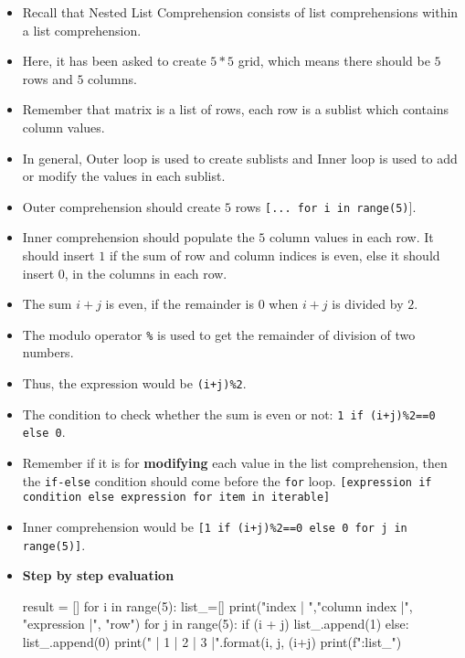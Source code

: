 \documentclass[10pt]{extarticle}
\begin{document}
\begin{itemize}
    \item Recall that Nested List Comprehension consists of list comprehensions within a list comprehension.
    \item Here, it has been asked to create $ 5*5$ grid, which means there should be $5$ rows and $5$ columns. 
    \item Remember that matrix is a list of rows, each row is a sublist which contains column values.
    \item In general, Outer loop is used to create sublists and Inner loop is used to add or modify the values in each sublist. 
    \item Outer comprehension should create $5$ rows  \colorbox{gray!20}{\texttt{[... for i in range(5)}]}.
    \item Inner comprehension should populate the $5$ column values in each row. It should insert $1$ if the sum of row and column indices is even, else it 
    should insert $0$, in the columns in each row.
    \item The sum $i + j$ is even, if the remainder is $0$ when $i + j$  is divided by $2$.
    \item The modulo operator \colorbox{gray!20}{\texttt{\%}} is used to get the remainder of division of two numbers. 
    \item Thus, the expression would be \colorbox{gray!20}{\texttt{(i+j)\%2}}.
    \item The condition to check whether the sum is even or not: \colorbox{gray!20}{\texttt{1 if (i+j)\%2==0 else 0}}.
    \item Remember if it is for \textbf{modifying} each value in the list comprehension, then the \texttt{if-else} condition should come before the \texttt{for} loop. \colorbox{gray!20}{\texttt{[expression if condition else expression for item in iterable]}}  
    \item Inner comprehension would be \colorbox{gray!20}{\texttt{[1 if (i+j)\%2==0 else 0 for j in range(5)]}}.
    \item \textbf{Step by step evaluation} 
    \begin{tcolorbox}[colback=gray!20, colframe=gray!50, sharp corners=southwest]
    \begin{pycode}
result = []
for i in range(5):
  list_=[]
  print("\nrow index | ","column index |", "expression |", "row")
  for j in range(5):
    if (i + j) %
      list_.append(1)
    else:
      list_.append(0)
    print("  |  {1}  |  {2}  |  {3}  |".format(i, j, (i+j)%
  print(f"\nRow:{list_}")    
 

    \end{pycode}
    \end{tcolorbox}
\end{itemize}
\end{document}
